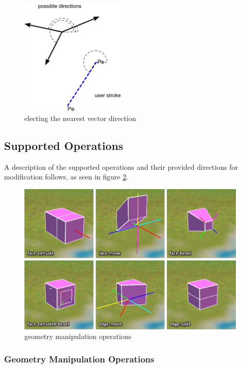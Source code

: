 \begin{figure}[!ht]
	\centering
	\includegraphics[width=5cm]{gfx/election.png}
	\caption{electing the nearest vector direction}
	\label{fig:election}
\end{figure}

\subsection{Supported Operations}

A description of the supported operations and their provided directions for modification follows,
as seen in figure \ref{fig:shots}.

\begin{figure}[!ht]
	\centering
	\includegraphics[width=11cm]{gfx/gs-ops.png}
	\caption{geometry manipulation operations}
	\label{fig:shots}
\end{figure}

\subsubsection{Geometry Manipulation Operations}

